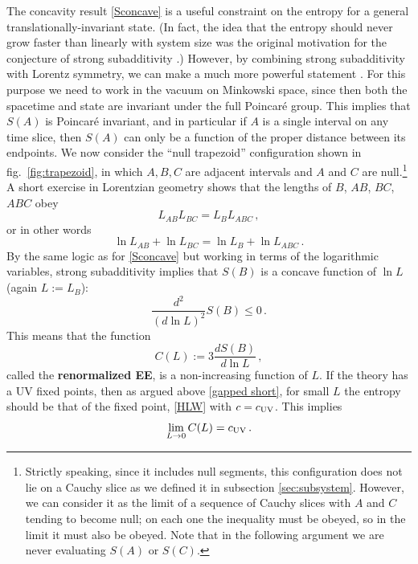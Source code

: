 \documentclass[11pt]{article}
\begin{document}
The concavity result \eqref{Sconcave} is a useful constraint on the entropy for a general translation\-ally-invariant state. (In fact, the idea that the entropy should never grow faster than linearly with system size was the original motivation for the conjecture of strong subadditivity \cite{doi:10.1063/1.1664685}.) However, by combining strong subadditivity with Lorentz symmetry, we can make a much more powerful statement \cite{Casini:2004bw}. For this purpose we need to work in the vacuum on Minkowski space, since then both the spacetime and state are invariant under the full Poincar\'e group. This implies that $S(A)$ is Poincar\'e invariant, and in particular if $A$ is a single interval on any time slice, then $S(A)$ can only be a function of the proper distance between its endpoints. We now consider the ``null trapezoid'' configuration shown in fig.\ \ref{fig:trapezoid}, in which $A,B,C$ are adjacent intervals and $A$ and $C$ are null.\footnote{Strictly speaking, since it includes null segments, this configuration does not lie on a Cauchy slice as we defined it in subsection \ref{sec:subsystem}. However, we can consider it as the limit of a sequence of Cauchy slices with $A$ and $C$ tending to become null; on each one the inequality must be obeyed, so in the limit it must also be obeyed. Note that in the following argument we are never evaluating $S(A)$ or $S(C)$.} A short exercise in Lorentzian geometry shows that the lengths of $B$, $AB$, $BC$, $ABC$ obey
\begin{equation}
L_{AB}L_{BC}=L_BL_{ABC}\,,
\end{equation}
or in other words
\begin{equation}
\ln L_{AB} + \ln L_{BC} = \ln L_B+\ln L_{ABC}\,.
\end{equation}
By the same logic as for \eqref{Sconcave} but working in terms of the logarithmic variables, strong subadditivity implies that $S(B)$ is a concave function of $\ln L$ (again $L:=L_B$):
\begin{equation}
\frac{d^2}{(d\ln L)^2}S(B)\le0\,.
\end{equation}
This means that the function
\begin{equation}\label{Cdef}
C(L):=3\frac{dS(B)}{d\ln L}\,,
\end{equation}
called the \textbf{renormalized EE}, is a non-increasing function of $L$. If the theory has a UV fixed points, then as argued above \eqref{gapped short}, for small $L$ the entropy should be that of the fixed point, \eqref{HLW} with $c=c_{\rm UV}$. This implies
\begin{equation}
\lim_{L\to0}C(L) = c_{\rm UV}\,.
\end{equation}
\end{document}
